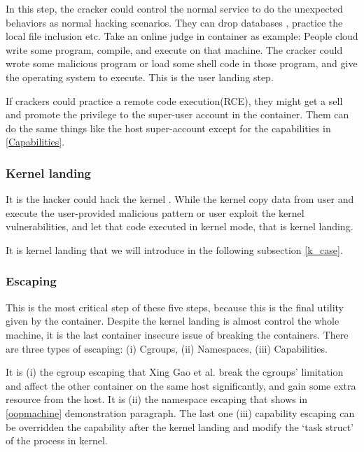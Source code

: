 In this step, the cracker could control the normal service to do the unexpected behaviors as
normal hacking scenarios. They can drop databases \cite{halfond2006classification} , practice
the local file inclusion \cite{hassan2018saisan, whitman2011principles} etc.
Take an online judge in container as example: People cloud write some program, compile, and execute on that
machine. The cracker could wrote some malicious program or load some shell code in those program,
and give the operating system to execute. This is the user landing step.

If crackers could practice a remote code execution(RCE), they might get a sell and promote the privilege to
the super-user account in the container. Them can do the same things like the host super-account except for
the capabilities in \ref{Capabilities}.

\subsubsection{Kernel landing}

It is the hacker could hack the kernel
\cite{gaspar2006root, dam2018automatic, jimenez2016vulnerability, 10.1007/978-1-4020-8739-4_86}.
While the kernel copy data from user and execute the user-provided malicious pattern
or user exploit the kernel vulnerabilities, and let that code executed in kernel mode, that is kernel landing.

It is kernel landing that we will introduce in the following subsection \ref{k_case}.

\subsubsection{Escaping}

This is the most critical step of these five steps, because this is the final utility given by the
container. Despite the kernel landing is almost control the whole machine, it is the last container
insecure issue of breaking the containers. There are three types of escaping: (\Rn{1}) Cgroups,
(\Rn{2}) Namespaces, (\Rn{3}) Capabilities.

It is (\Rn{1}) the cgroup escaping that Xing Gao et al. \cite{10.1145/3319535.3354227} break the
cgroups' limitation and affect the other container on the same host significantly, and gain
some extra resource from the host. It is (\Rn{2}) the namespace escaping that shows in \ref{oopmachine}
demonstration paragraph.
The last one (\Rn{3}) capability escaping can be overridden the capability after the kernel landing
and modify the `task struct' of the process in kernel.

